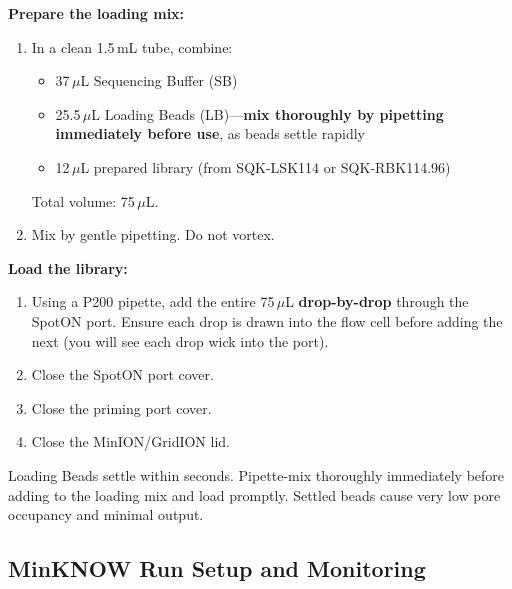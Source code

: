 \begin{protocolbox}[title={Protocol: Library Loading}]
\textbf{Prepare the loading mix:}
\begin{enumerate}[nosep]
  \item In a clean 1.5\,mL tube, combine:
    \begin{itemize}[nosep]
      \item 37\,$\mu$L Sequencing Buffer (SB)
      \item 25.5\,$\mu$L Loading Beads (LB)---\textbf{mix thoroughly by pipetting immediately before use}, as beads settle rapidly
      \item 12\,$\mu$L prepared library (from SQK-LSK114 or SQK-RBK114.96)
    \end{itemize}
    Total volume: 75\,$\mu$L.
  \item Mix by gentle pipetting. Do not vortex.
\end{enumerate}

\textbf{Load the library:}
\begin{enumerate}[nosep, start=3]
  \item Using a P200 pipette, add the entire 75\,$\mu$L \textbf{drop-by-drop} through the SpotON port. Ensure each drop is drawn into the flow cell before adding the next (you will see each drop wick into the port).
  \item Close the SpotON port cover.
  \item Close the priming port cover.
  \item Close the MinION/GridION lid.
\end{enumerate}
\end{protocolbox}
\begin{warningbox}[title={Loading Beads Must Be Mixed}]
Loading Beads settle within seconds. Pipette-mix thoroughly immediately before adding to the loading mix and load promptly. Settled beads cause very low pore occupancy and minimal output.
\end{warningbox}

\subsection{MinKNOW Run Setup and Monitoring}
\label{subsec:protocols:minknow}

